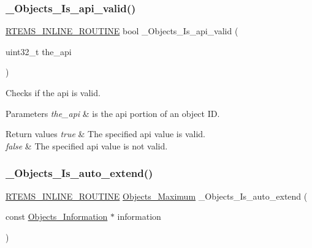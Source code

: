 \subsubsection{\texorpdfstring{\_Objects\_Is\_api\_valid()}{\_Objects\_Is\_api\_valid()}}
{\footnotesize\ttfamily \mbox{\hyperlink{group__RTEMSScoreBaseDefs_gac216239df231d5dbd15e3520b0b9313f}{R\+T\+E\+M\+S\+\_\+\+I\+N\+L\+I\+N\+E\+\_\+\+R\+O\+U\+T\+I\+NE}} bool \+\_\+\+Objects\+\_\+\+Is\+\_\+api\+\_\+valid (\begin{DoxyParamCaption}\item[{uint32\+\_\+t}]{the\+\_\+api }\end{DoxyParamCaption})}



Checks if the api is valid. 


\begin{DoxyParams}{Parameters}
{\em the\+\_\+api} & is the api portion of an object ID.\\
\hline
\end{DoxyParams}

\begin{DoxyRetVals}{Return values}
{\em true} & The specified api value is valid. \\
\hline
{\em false} & The specified api value is not valid. \\
\hline
\end{DoxyRetVals}
\mbox{\label{group__RTEMSScoreObject_gaba65e2c96c6fde53bea31b45152fb79d}} 
\subsubsection{\texorpdfstring{\_Objects\_Is\_auto\_extend()}{\_Objects\_Is\_auto\_extend()}}
{\footnotesize\ttfamily \mbox{\hyperlink{group__RTEMSScoreBaseDefs_gac216239df231d5dbd15e3520b0b9313f}{R\+T\+E\+M\+S\+\_\+\+I\+N\+L\+I\+N\+E\+\_\+\+R\+O\+U\+T\+I\+NE}} \mbox{\hyperlink{group__RTEMSScoreObject_gaa2735357885ec7d7157c32f3f835f9ae}{Objects\+\_\+\+Maximum}} \+\_\+\+Objects\+\_\+\+Is\+\_\+auto\+\_\+extend (\begin{DoxyParamCaption}\item[{const \mbox{\hyperlink{structObjects__Information}{Objects\+\_\+\+Information}} $\ast$}]{information }\end{DoxyParamCaption})}




